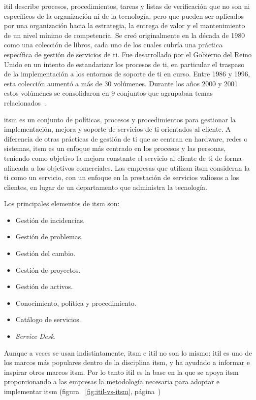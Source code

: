 \acrfull{itil} describe procesos, procedimientos, tareas y listas de verificación que no son ni específicos de la organización ni de la tecnología, pero que pueden ser aplicados por una organización hacia la estrategia, la entrega de valor y el mantenimiento de un nivel mínimo de competencia. Se creó originalmente en la década de 1980 como una colección de libros, cada uno de los cuales cubría una práctica específica de gestión de servicios de \acrshort{ti}. Fue desarrollado por el Gobierno del Reino Unido en un intento de estandarizar los procesos de \acrshort{ti}, en particular el traspaso de la implementación a los entornos de soporte de \acrshort{ti} en curso. Entre 1986 y 1996, esta colección aumentó a más de 30 volúmenes. Durante los años 2000 y 2001 estos volúmenes se consolidaron en 9 conjuntos que agrupaban temas relacionados~\cite{Exin, ItilWiki}. 


\acrfull{itsm} es un conjunto de políticas, procesos y procedimientos para gestionar la implementación, mejora y soporte de servicios de \acrshort{ti} orientados al cliente. A diferencia de otras prácticas de gestión de \acrshort{ti} que se centran en hardware, redes o sistemas, \acrshort{itsm} es un enfoque más centrado en los procesos y las personas, teniendo como objetivo la mejora constante el servicio al cliente de \acrshort{ti} de forma alineada a los objetivos comerciales. Las empresas que utilizan \acrshort{itsm} consideran la \acrshort{ti} como un servicio, con un enfoque en la prestación de servicios valiosos a los clientes, en lugar de un departamento que administra la tecnología.

Los principales elementos de \acrshort{itsm} son:

\begin{itemize}
\item Gestión de incidencias.
\item Gestión de problemas. 
\item Gestión del cambio. 
\item Gestión de proyectos. 
\item Gestión de activos. 
\item Conocimiento, política y procedimiento. 
\item Catálogo de servicios. 
\item \textit{Service Desk.}
\end{itemize}

Aunque a veces se usan indistintamente, \acrshort{itsm} e \acrshort{itil} no son lo mismo: \acrshort{itil} es uno de los marcos más populares dentro de la disciplina \acrshort{itsm}, y ha ayudado a informar e inspirar otros marcos \acrshort{itsm}. Por lo tanto \acrshort{itil} es la base en la que se apoya \acrshort{itsm} proporcionando a las empresas la metodología necesaria para adoptar e implementar \acrshort{itsm} (figura ~\ref{fig:itil-vs-itsm},  página~\pageref{fig:itil-vs-itsm})

